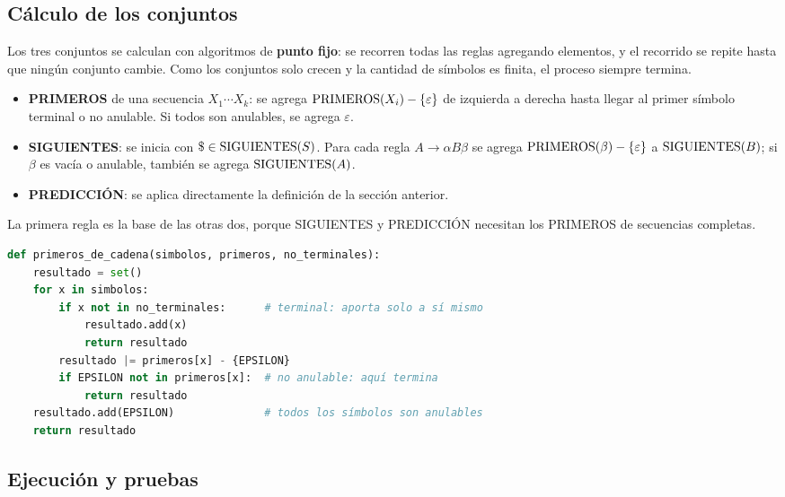 \documentclass[12pt,letterpaper]{article}
\newcommand{\prim}{\textup{PRIMEROS}}
\newcommand{\sig}{\textup{SIGUIENTES}}
\begin{document}
\subsection{Cálculo de los conjuntos}

Los tres conjuntos se calculan con algoritmos de \textbf{punto fijo}: se recorren todas las reglas agregando elementos, y el recorrido se repite hasta que ningún conjunto cambie. Como los conjuntos solo crecen y la cantidad de símbolos es finita, el proceso siempre termina.

\begin{itemize}
  \item \textbf{PRIMEROS} de una secuencia $X_1 \cdots X_k$: se agrega $\prim(X_i) - \{\varepsilon\}$ de izquierda a derecha hasta llegar al primer símbolo terminal o no anulable. Si todos son anulables, se agrega $\varepsilon$.
  \item \textbf{SIGUIENTES}: se inicia con $\$ \in \sig(S)$. Para cada regla $A \rightarrow \alpha B \beta$ se agrega $\prim(\beta) - \{\varepsilon\}$ a $\sig(B)$; si $\beta$ es vacía o anulable, también se agrega $\sig(A)$.
  \item \textbf{PREDICCIÓN}: se aplica directamente la definición de la sección anterior.
\end{itemize}

La primera regla es la base de las otras dos, porque SIGUIENTES y PREDICCIÓN necesitan los PRIMEROS de secuencias completas.

\noindent\begin{minipage}{\linewidth}
\begin{lstlisting}[language=Python,basicstyle=\ttfamily\footnotesize,caption={PRIMEROS de una secuencia en \texttt{conjuntos.py} (sin anotaciones de tipo).}]
def primeros_de_cadena(simbolos, primeros, no_terminales):
    resultado = set()
    for x in simbolos:
        if x not in no_terminales:      # terminal: aporta solo a sí mismo
            resultado.add(x)
            return resultado
        resultado |= primeros[x] - {EPSILON}
        if EPSILON not in primeros[x]:  # no anulable: aquí termina
            return resultado
    resultado.add(EPSILON)              # todos los símbolos son anulables
    return resultado
\end{lstlisting}
\end{minipage}

\subsection{Ejecución y pruebas}
\end{document}
